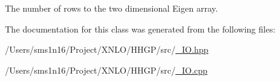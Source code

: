The number of rows to the two dimensional Eigen array. 

The documentation for this class was generated from the following files\+:\begin{DoxyCompactItemize}
\item 
/\+Users/sms1n16/\+Project/\+X\+N\+L\+O/\+H\+H\+G\+P/src/\hyperlink{___i_o_8hpp}{\+\_\+\+I\+O.\+hpp}\item 
/\+Users/sms1n16/\+Project/\+X\+N\+L\+O/\+H\+H\+G\+P/src/\hyperlink{___i_o_8cpp}{\+\_\+\+I\+O.\+cpp}\end{DoxyCompactItemize}

